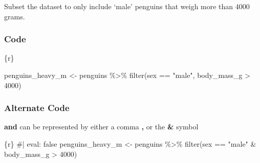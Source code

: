 \documentclass[
  letterpaper,
  DIV=11,
  numbers=noendperiod]{scrreprt}
\newenvironment{Shaded}{\begin{snugshade}}{\end{snugshade}}
\newcommand{\CommentTok}[1]{\textcolor[rgb]{0.37,0.37,0.37}{#1}}
\newcommand{\DecValTok}[1]{\textcolor[rgb]{0.68,0.00,0.00}{#1}}
\newcommand{\FunctionTok}[1]{\textcolor[rgb]{0.28,0.35,0.67}{#1}}
\newcommand{\InformationTok}[1]{\textcolor[rgb]{0.37,0.37,0.37}{#1}}
\newcommand{\NormalTok}[1]{\textcolor[rgb]{0.00,0.23,0.31}{#1}}
\newcommand{\OtherTok}[1]{\textcolor[rgb]{0.00,0.23,0.31}{#1}}
\newcommand{\SpecialCharTok}[1]{\textcolor[rgb]{0.37,0.37,0.37}{#1}}
\newcommand{\StringTok}[1]{\textcolor[rgb]{0.13,0.47,0.30}{#1}}
\begin{document}
\begin{tcolorbox}[enhanced jigsaw, colframe=quarto-callout-note-color-frame, breakable, colback=white, toprule=.15mm, leftrule=.75mm, left=2mm, opacityback=0, rightrule=.15mm, arc=.35mm, bottomrule=.15mm]
\end{tcolorbox}

\begin{tcolorbox}[enhanced jigsaw, colframe=quarto-callout-note-color-frame, breakable, colback=white, toprule=.15mm, leftrule=.75mm, left=2mm, opacityback=0, rightrule=.15mm, arc=.35mm, bottomrule=.15mm]
Subset the dataset to only include `male' penguins that weigh more than
4000 grams.

\hypertarget{code-5}{%
\subsubsection*{Code}\label{code-5}}

\begin{Shaded}
\begin{Highlighting}[]
\InformationTok{\textasciigrave{}\textasciigrave{}\textasciigrave{}\{r\}}

\NormalTok{penguins\_heavy\_m }\OtherTok{\textless{}{-}}\NormalTok{ penguins }\SpecialCharTok{\%\textgreater{}\%} 
  \FunctionTok{filter}\NormalTok{(sex }\SpecialCharTok{==} \StringTok{"male"}\NormalTok{, body\_mass\_g }\SpecialCharTok{\textgreater{}} \DecValTok{4000}\NormalTok{)}
\InformationTok{\textasciigrave{}\textasciigrave{}\textasciigrave{}}
\end{Highlighting}
\end{Shaded}

\hypertarget{alternate-code}{%
\subsubsection*{Alternate Code}\label{alternate-code}}

\textbf{and} can be represented by either a comma \textbf{,} or the
\textbf{\&} symbol

\begin{Shaded}
\begin{Highlighting}[]
\InformationTok{\textasciigrave{}\textasciigrave{}\textasciigrave{}\{r\}}
\CommentTok{\#| eval: false}
\NormalTok{penguins\_heavy\_m }\OtherTok{\textless{}{-}}\NormalTok{ penguins }\SpecialCharTok{\%\textgreater{}\%} 
  \FunctionTok{filter}\NormalTok{(sex }\SpecialCharTok{==} \StringTok{"male"} \SpecialCharTok{\&}\NormalTok{ body\_mass\_g }\SpecialCharTok{\textgreater{}} \DecValTok{4000}\NormalTok{)}
\InformationTok{\textasciigrave{}\textasciigrave{}\textasciigrave{}}
\end{Highlighting}
\end{Shaded}


\end{tcolorbox}
\end{document}
